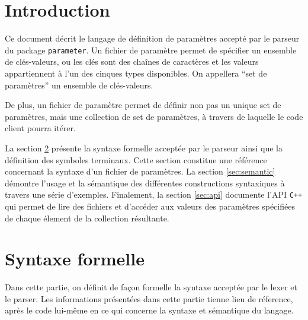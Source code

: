 \section{Introduction}
Ce document d\'ecrit le langage de d\'efinition de param\`etres
accept\'e par le parseur du package \texttt{parameter}. Un fichier de
param\`etre permet de sp\'ecifier un ensemble de cl\'es-valeurs, ou
les cl\'es sont des cha\^ines de caract\`eres et les valeurs
appartiennent \`a l'un des cinques types disponibles. On appellera
``set de param\`etres'' un ensemble de cl\'es-valeurs.

De plus, un fichier de param\`etre permet de d\'efinir non pas un
unique set de param\`etres, mais une collection de set de
param\`etres, \`a travers de laquelle le code client pourra it\'erer.


La section \ref{sec:syntax} pr\'esente la syntaxe formelle accept\'ee
par le parseur ainsi que la d\'efinition des symboles terminaux. Cette
section constitue une r\'ef\'erence concernant la syntaxe d'un fichier
de param\`etres. La section \ref{sec:semantic} d\'emontre l'usage et
la s\'emantique des diff\'erentes constructions syntaxiques \`a
travers une s\'erie d'exemples. Finalement, la section \ref{sec:api}
documente l'API \texttt{C++} qui permet de lire des fichiers et
d'acc\'eder aux valeurs des param\`etres sp\'ecifi\'ees de chaque
\'element de la collection r\'esultante.


\section{Syntaxe formelle}\label{sec:syntax}
Dans cette partie, on d\'efinit de fa\c con formelle la syntaxe
accept\'ee par le lexer et le parser. Les informations pr\'esent\'ees
dans cette partie tienne lieu de r\'eference, apr\`es le code
lui-m\^eme en ce qui concerne la syntaxe et s\'emantique du
langage.

